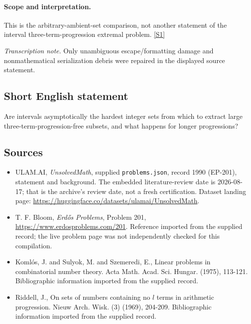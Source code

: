 \documentclass[11pt,a4paper]{article}
\newcommand{\sref}[2]{\hyperlink{source:#1:#2}{[S#2]}}
\begin{document}
\paragraph{Scope and interpretation.}

This is the arbitrary-ambient-set comparison, not another statement of the interval three-term-progression extremal problem. \sref{1990}{1}

{\small\emph{Transcription note.} Only unambiguous escape/formatting damage and nonmathematical serialization debris were repaired in the displayed source statement.}

\subsection{Short English statement}

Are intervals asymptotically the hardest integer sets from which to extract large three-term-progression-free subsets, and what happens for longer progressions?

\subsection{Sources}

{\small

\begin{itemize}

\item[\hypertarget{source:1990:1}{S1}] ULAM.AI, \emph{UnsolvedMath}, supplied \texttt{problems.json}, record 1990 (EP-201), statement and background. The embedded literature-review date is 2026-08-17; that is the archive’s review date, not a fresh certification. Dataset landing page: \url{https://huggingface.co/datasets/ulamai/UnsolvedMath}.

\item[\hypertarget{source:1990:2}{S2}] T. F. Bloom, \emph{Erdős Problems}, Problem 201, \url{https://www.erdosproblems.com/201}. Reference imported from the supplied record; the live problem page was not independently checked for this compilation.

\item[\hypertarget{source:1990:3}{S3}] Koml\'{o}s, J. and Sulyok, M. and Szemeredi, E., Linear problems in combinatorial number theory. Acta Math. Acad. Sci. Hungar. (1975), 113-121. Bibliographic information imported from the supplied record.

\item[\hypertarget{source:1990:4}{S4}] Riddell, J., On sets of numbers containing no $l$ terms in arithmetic progression. Nieuw Arch. Wisk. (3) (1969), 204-209. Bibliographic information imported from the supplied record.

\end{itemize}

}

\label{end:1990}
\end{document}
